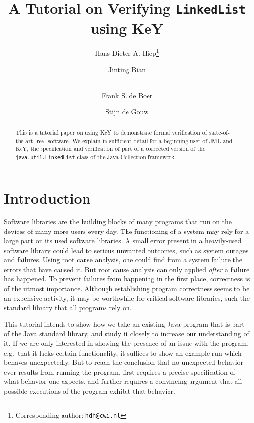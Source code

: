 \documentclass[runningheads]{llncs}
\begin{document}
\title{A Tutorial on Verifying \texttt{LinkedList} using KeY}
\author{{Hans-Dieter} A. Hiep\footnote{Corresponding author: \texttt{hdh@cwi.nl}}\and Jinting Bian\and\\
Frank S. de Boer\and Stijn de Gouw}

\maketitle

\begin{abstract}
This is a tutorial paper on using KeY to demonstrate formal verification of state-of-the-art, real software. We explain in sufficient detail for a beginning user of JML and KeY, the specification and verification of part of a corrected version of the \texttt{java.util.LinkedList} class of the Java Collection framework.
\end{abstract}


\section{Introduction}

Software libraries are the building blocks of many programs that run on the devices of many more users every day. The functioning of a system may rely for a large part on its used software libraries. A small error present in a heavily-used software library could lead to serious unwanted outcomes, such as system outages and failures. Using root cause analysis, one could find from a system failure the errors that have caused it. But root cause analysis can only applied \emph{after} a failure has happened. To prevent failures from happening in the first place, correctness is of the utmost importance. Although establishing program correctness seems to be an expensive activity, it may be worthwhile for critical software libraries, such the standard library that all programs rely on.

This tutorial intends to show how we take an existing Java program that is part of the Java standard library, and study it closely to increase our understanding of it. If we are only interested in showing the presence of an issue with the program, e.g.~that it lacks certain functionality, it suffices to show an example run which behaves unexpectedly. But to reach the conclusion that no unexpected behavior ever results from running the program, first requires a precise specification of what behavior one expects, and further requires a convincing argument that all possible executions of the program exhibit that behavior.
\end{document}
